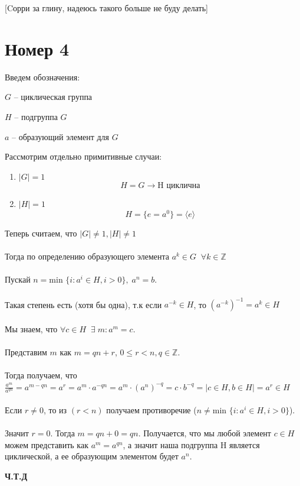 \documentclass[a4paper,12pt]{article}
\begin{document}
\begin{center}
[Cорри за глину, надеюсь такого больше не буду делать]
\end{center}
\clearpage
\section*{Номер 4}
Введем обозначения:
\begin{center}
$G$ -- циклическая группа

$H$ -- подгруппа $G$

$a$ -- образующий элемент для $G$ 
\end{center}
Рассмотрим отдельно примитивные случаи:
\begin{enumerate}
\item
$|G| = 1$
\[
H = G \rightarrow \text{H циклична}
\]
\item 
$|H| = 1$
\[
H = \{ e = a^0\} = \langle e \rangle
\]
\end{enumerate}
Теперь считаем, что $|G| \neq 1, |H| \neq 1$
\\\\
Тогда по определению образующего элемента \;
$
a^k \in G \;  \; \forall k \in \mathbb{Z}
$
\\\\
Пускай $ n = \text{min } \{ i : a^i \in H, i > 0\}, \; a^n = b $. 
\\\\
Такая степень есть (хотя бы одна), т.к если $a^{-k} \in H$, то $\left(a^{-k} \right)^{-1} = a^k  \in H $
\\\\
Мы знаем, что $
\forall c  \in H \;  \; \exists \;  m : a^m = c
$.
\\\\
Представим $m$ как $m = qn + r$, \;$0 \leq  r < n, q \in \mathbb{Z}$.
\\\\
Тогда получаем, что $
\frac{a^m}{a^{qn}} = a^{m - qn} = a^r  = a^m \cdot a^{-qn} = a^m \cdot \left( a^{n} \right)^{-q} = c \cdot b^{-q} = \big| c \in H, b \in H \big | = a^r \in H
$
\\\\
Если $ r \neq 0$,  то из $ (r < n)$ получаем противоречие ($n \neq \text{min } \{ i : a^i \in H, i > 0\}$). 
\\\\
Значит $ r = 0$. Тогда $m = qn + 0 = qn$. Получается, что мы любой элемент $c \in H$ можем представить как $a^m = a^{qn}$, а значит наша подгруппа H является циклической, а ее образующим элементом будет $a^n$.
\begin{center}
\textbf{Ч.Т.Д}
\end{center}
\end{document}
